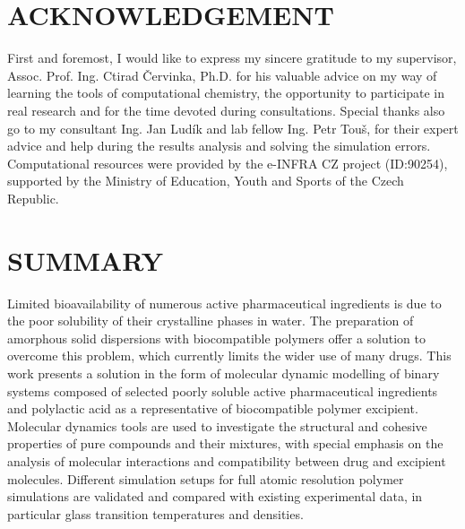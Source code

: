 % 

%


\newpage
\thispagestyle{empty}

\vspace*{\fill}
\section*{ACKNOWLEDGEMENT}
\mbox
\indent First and foremost, I would like to express my sincere gratitude to my supervisor, Assoc. Prof. Ing. Ctirad Červinka, Ph.D. for his valuable advice on my way of learning the tools of computational chemistry, the opportunity to participate in real research and for the time devoted during consultations. Special thanks also go to my consultant Ing. Jan Ludík and lab fellow Ing. Petr Touš, for their expert advice and help during the results analysis and solving the simulation errors. Computational resources were provided by the e-INFRA CZ project (ID:90254), supported by the Ministry of Education, Youth and Sports of the Czech Republic.





\newpage
\thispagestyle{empty}

\section*{SUMMARY}
Limited bioavailability of numerous active pharmaceutical ingredients is due to the poor solubility of their crystalline phases in water. The preparation of amorphous solid dispersions with biocompatible polymers offer a solution to overcome this problem, which currently limits the wider use of many drugs. This work presents a solution in the form of molecular dynamic modelling of binary systems composed of selected poorly soluble active pharmaceutical ingredients and polylactic acid as a representative of biocompatible polymer excipient. Molecular dynamics tools are used to investigate the structural and cohesive properties of pure compounds and their mixtures, with special emphasis on the analysis of molecular interactions and compatibility between drug and excipient molecules. Different simulation setups for full atomic resolution polymer simulations are validated and compared with existing experimental data, in particular glass transition temperatures and densities.

